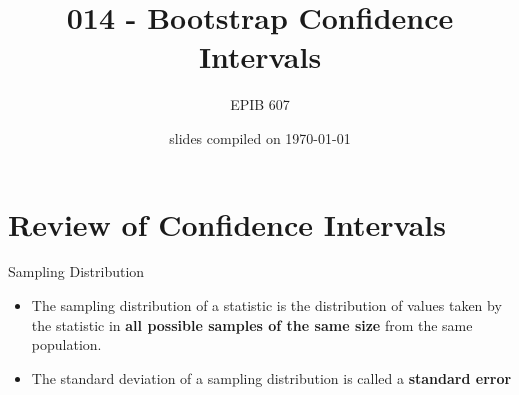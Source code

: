 \documentclass[10pt]{beamer}\usepackage[]{graphicx}\usepackage[]{color}
\begin{document}
	
	
	
	
	\title{014 - Bootstrap Confidence Intervals}
	\author{EPIB 607}
	
	\date{slides compiled on \today}
	
	\maketitle


\section{Review of Confidence Intervals}

\begin{frame}{Sampling Distribution}
	
	\begin{definition}
		\begin{itemize}
			\item The sampling distribution of a statistic is the distribution of values taken by the statistic in \textbf{all possible samples of the same size} from the same population.
			\item The standard deviation of a sampling distribution is called a \textbf{standard error}
		\end{itemize} 
	\end{definition}
	
	
\end{frame}
\end{document}
